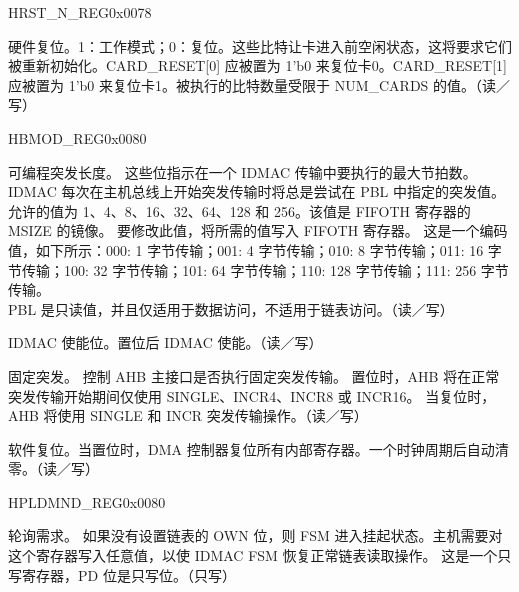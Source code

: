 \begin{register}{H}{RST\_N\_REG}{0x0078}\label{regdesc:RSTNREG}
%
%
\regnewline%
\begin{regdesc}\begin{reglist}
\item [RST\_CARD\_RESET]硬件复位。1：工作模式；0：复位。这些比特让卡进入前空闲状态，这将要求它们被重新初始化。CARD\_RESET[0] 应被置为 1'b0 来复位卡0。CARD\_RESET[1] 应被置为 1'b0 来复位卡1。被执行的比特数量受限于 NUM\_CARDS 的值。（读／写）
\end{reglist}\end{regdesc}
\end{register}


\begin{register}{H}{BMOD\_REG}{0x0080}\label{regdesc:BMODREG}
%
%
%
%
%
%
\regnewline%
\begin{regdesc}\begin{reglist}
\item [BMOD\_PBL]可编程突发长度。 这些位指示在一个 IDMAC 传输中要执行的最大节拍数。 IDMAC 每次在主机总线上开始突发传输时将总是尝试在 PBL 中指定的突发值。允许的值为 1、4、8、16、32、64、128 和 256。该值是 FIFOTH 寄存器的 MSIZE 的镜像。 要修改此值，将所需的值写入 FIFOTH 寄存器。 这是一个编码值，如下所示：000: 1 字节传输；001: 4 字节传输；010: 8 字节传输；011: 16 字节传输；100: 32 字节传输；101: 64 字节传输；110: 128 字节传输；111: 256 字节传输。\\
PBL 是只读值，并且仅适用于数据访问，不适用于链表访问。（读／写）
\item [BMOD\_DE]IDMAC 使能位。置位后 IDMAC 使能。（读／写）
\item [BMOD\_FB]固定突发。 控制 AHB 主接口是否执行固定突发传输。 置位时，AHB 将在正常突发传输开始期间仅使用 SINGLE、INCR4、INCR8 或 INCR16。 当复位时，AHB 将使用 SINGLE 和 INCR 突发传输操作。（读／写）
\item [BMOD\_SWR]软件复位。当置位时，DMA 控制器复位所有内部寄存器。一个时钟周期后自动清零。（读／写）
\end{reglist}\end{regdesc}
\end{register}


\begin{register}{H}{PLDMND\_REG}{0x0080}\label{regdesc:PLDMNDREG}
%
\regnewline%
\begin{regdesc}\begin{reglist}
\item [PLDMND\_REG]轮询需求。 如果没有设置链表的 OWN 位，则 FSM 进入挂起状态。主机需要对这个寄存器写入任意值，以使 IDMAC FSM 恢复正常链表读取操作。 这是一个只写寄存器，PD 位是只写位。（只写）
\end{reglist}\end{regdesc}
\end{register}


